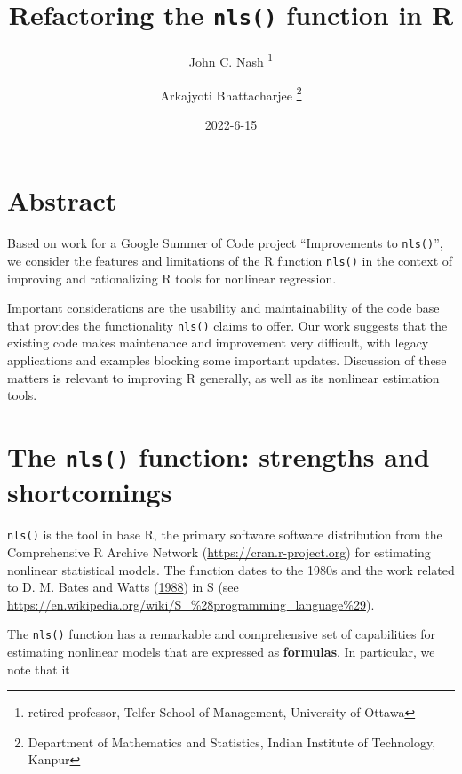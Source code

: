 \documentclass[
]{article}
\title{Refactoring the \texttt{nls()} function in R}
\author{John C. Nash
\thanks{ retired professor, Telfer School of Management, University of Ottawa} \and Arkajyoti
Bhattacharjee
\thanks{Department of Mathematics and Statistics, Indian Institute of Technology, Kanpur}}
\date{2022-6-15}
\begin{document}
\maketitle

{
\hypersetup{linkcolor=}
\setcounter{tocdepth}{2}
\tableofcontents
}
\hypertarget{abstract}{%
\section{Abstract}\label{abstract}}

Based on work for a Google Summer of Code project ``Improvements to
\texttt{nls()}'', we consider the features and limitations of the R
function \texttt{nls()} in the context of improving and rationalizing R
tools for nonlinear regression.

Important considerations are the usability and maintainability of the
code base that provides the functionality \texttt{nls()} claims to
offer. Our work suggests that the existing code makes maintenance and
improvement very difficult, with legacy applications and examples
blocking some important updates. Discussion of these matters is relevant
to improving R generally, as well as its nonlinear estimation tools.

\hypertarget{the-nls-function-strengths-and-shortcomings}{%
\section{\texorpdfstring{The \texttt{nls()} function: strengths and
shortcomings}{The nls() function: strengths and shortcomings}}\label{the-nls-function-strengths-and-shortcomings}}

\texttt{nls()} is the tool in base R, the primary software software
distribution from the Comprehensive R Archive Network
(\url{https://cran.r-project.org}) for estimating nonlinear statistical
models. The function dates to the 1980s and the work related to D. M.
Bates and Watts (\protect\hyperlink{ref-bateswatts}{1988}) in S (see
\url{https://en.wikipedia.org/wiki/S_\%28programming_language\%29}).

The \texttt{nls()} function has a remarkable and comprehensive set of
capabilities for estimating nonlinear models that are expressed as
\textbf{formulas}. In particular, we note that it
\end{document}
